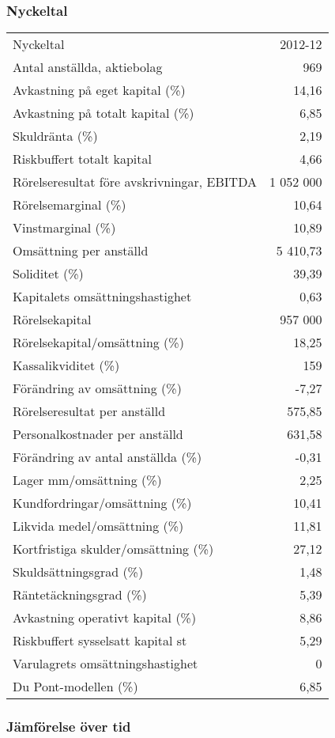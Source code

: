 \documentclass[10pt,a4paper]{article}
\begin{document}
\subsubsection{Nyckeltal}
\begin{tabular}{ l r }
	Nyckeltal & 2012-12\\
	Antal anställda, aktiebolag & 969\\
	Avkastning på eget kapital (\%) & 14,16\\
	Avkastning på totalt kapital (\%) & 6,85\\
	Skuldränta (\%) & 2,19\\
	Riskbuffert totalt kapital & 4,66\\
	Rörelseresultat före avskrivningar, EBITDA & 1 052 000\\
	Rörelsemarginal (\%) & 10,64\\
	Vinstmarginal (\%) & 10,89\\
	Omsättning per anställd & 5 410,73\\
	Soliditet (\%) & 39,39\\
	Kapitalets omsättningshastighet & 0,63\\
	Rörelsekapital & 957 000\\
	Rörelsekapital/omsättning (\%) & 18,25\\
	Kassalikviditet (\%) & 159\\
	Förändring av omsättning (\%) & -7,27\\
	Rörelseresultat per anställd & 575,85\\
	Personalkostnader per anställd & 631,58\\
	Förändring av antal anställda (\%) & -0,31\\
	Lager mm/omsättning (\%) & 2,25\\
	Kundfordringar/omsättning (\%) & 10,41\\
	Likvida medel/omsättning (\%) & 11,81\\
	Kortfristiga skulder/omsättning (\%) & 27,12\\
	Skuldsättningsgrad (\%) & 1,48\\
	Räntetäckningsgrad (\%) & 5,39\\
	Avkastning operativt kapital (\%) & 8,86\\
	Riskbuffert sysselsatt kapital st & 5,29\\
	Varulagrets omsättningshastighet & 0\\
	Du Pont-modellen (\%) & 6,85\\
\end{tabular}
\subsubsection{Jämförelse över tid}
\end{document}
